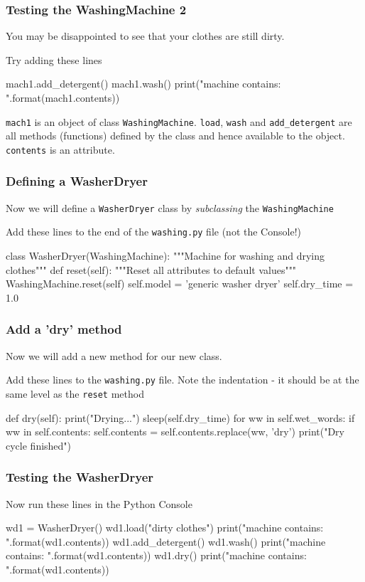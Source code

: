 \documentclass{beamer}
\begin{document}
\begin{frame}[fragile]
\frametitle{Testing the WashingMachine 2}
You may be disappointed to see that your clothes are still dirty.

Try adding these lines
\begin{code} 
mach1.add_detergent()
mach1.wash()
print("machine contains: {}".format(mach1.contents))
\end{code}

\texttt{mach1} is an object of class \texttt{WashingMachine}.
\texttt{load}, \texttt{wash} and \texttt{add\_detergent}
are all methods (functions) defined by the class and hence available to the object.
\texttt{contents} is an attribute.

\end{frame}

\begin{frame}[fragile]
\frametitle{Defining a WasherDryer}
Now we will define a \texttt{WasherDryer} class by \emph{subclassing} the \texttt{WashingMachine}

Add these lines to the end of the \texttt{washing.py} file (not the Console!)
\begin{code} 
class WasherDryer(WashingMachine):
    """Machine for washing and drying clothes"""
    def reset(self):
        """Reset all attributes to default values"""
        WashingMachine.reset(self)
        self.model = 'generic washer dryer'
        self.dry_time = 1.0
\end{code}

\end{frame}

\begin{frame}[fragile]
\frametitle{Add a 'dry' method}
Now we will add a new method for our new class.

Add these lines to the \texttt{washing.py} file. Note the indentation - 
it should be at the same level as the \texttt{reset} method
\begin{code} 
    def dry(self):
        print("Drying...")
        sleep(self.dry_time)
        for ww in self.wet_words:
            if ww in self.contents:
                self.contents = self.contents.replace(ww, 
                                                   'dry')
        print("Dry cycle finished")
\end{code}
\end{frame}

\begin{frame}[fragile]
\frametitle{Testing the WasherDryer}

Now run these lines in the Python Console

\begin{code} 
wd1 = WasherDryer()
wd1.load("dirty clothes")
print("machine contains: {}".format(wd1.contents))
wd1.add_detergent()
wd1.wash()
print("machine contains: {}".format(wd1.contents))
wd1.dry()
print("machine contains: {}".format(wd1.contents))
\end{code}

\end{frame}
\end{document}
